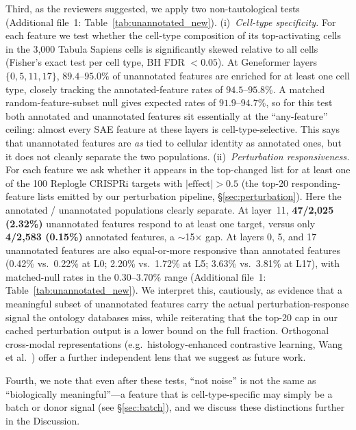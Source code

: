 \documentclass[onecolumn]{article}
\begin{document}
Third, as the reviewers suggested, we apply two non-tautological tests (Additional file~1: Table~\ref{tab:unannotated_new}). (i)~\emph{Cell-type specificity.} For each feature we test whether the cell-type composition of its top-activating cells in the 3{,}000 Tabula Sapiens cells is significantly skewed relative to all cells (Fisher's exact test per cell type, BH FDR $< 0.05$). At Geneformer layers $\{0, 5, 11, 17\}$, $89.4$--$95.0\%$ of unannotated features are enriched for at least one cell type, closely tracking the annotated-feature rates of $94.5$--$95.8\%$. A matched random-feature-subset null gives expected rates of $91.9$--$94.7\%$, so for this test both annotated and unannotated features sit essentially at the ``any-feature'' ceiling: almost every SAE feature at these layers is cell-type-selective. This says that unannotated features are \emph{as} tied to cellular identity as annotated ones, but it does not cleanly separate the two populations. (ii)~\emph{Perturbation responsiveness.} For each feature we ask whether it appears in the top-changed list for at least one of the 100 Replogle CRISPRi targets with $|\text{effect}| > 0.5$ (the top-20 responding-feature lists emitted by our perturbation pipeline, §\ref{sec:perturbation}). Here the annotated / unannotated populations clearly separate. At layer~11, \textbf{47/2{,}025 (2.32\%)} unannotated features respond to at least one target, versus only \textbf{4/2{,}583 (0.15\%)} annotated features, a $\sim$15$\times$ gap. At layers 0, 5, and 17 unannotated features are also equal-or-more responsive than annotated features (0.42\% vs.\ 0.22\% at L0; 2.20\% vs.\ 1.72\% at L5; 3.63\% vs.\ 3.81\% at L17), with matched-null rates in the 0.30--3.70\% range (Additional file~1: Table~\ref{tab:unannotated_new}). We interpret this, cautiously, as evidence that a meaningful subset of unannotated features carry the actual perturbation-response signal the ontology databases miss, while reiterating that the top-20 cap in our cached perturbation output is a lower bound on the full fraction. Orthogonal cross-modal representations (e.g.~histology-enhanced contrastive learning, Wang et al.~\cite{wang2025heclip}) offer a further independent lens that we suggest as future work.

Fourth, we note that even after these tests, ``not noise'' is not the same as ``biologically meaningful''---a feature that is cell-type-specific may simply be a batch or donor signal (see \S\ref{sec:batch}), and we discuss these distinctions further in the Discussion.
\end{document}

